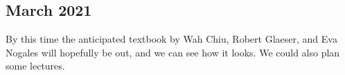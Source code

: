 \documentclass[11pt, oneside]{article}   	%
\begin{document}
%



\pagebreak
\subsection{March 2021}
By this time the anticipated textbook by Wah Chiu, Robert Glaeser, and Eva Nogales will hopefully be out, and we can see how it looks. We could also plan some lectures.
\end{document}
